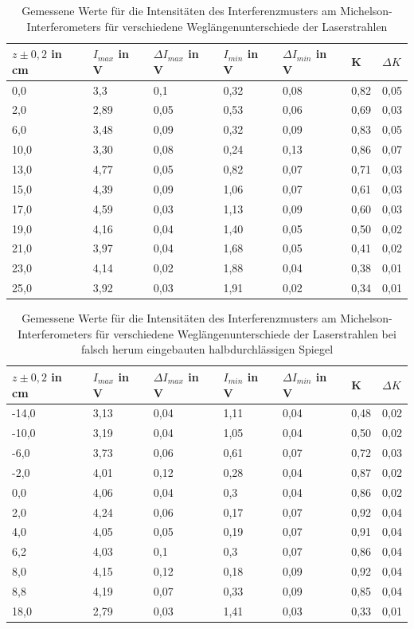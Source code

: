 \documentclass[10pt,a4paper]{article}
\begin{document}
\begin{table}[h!]
	\centering
	\begin{tabular}{|l|l|l|l|l|l|l|}\hline
		$z \pm 0,2$ in cm & $I_{max}$ in V & $\Delta I_{max}$ in V & $I_{min}$ in V & $\Delta I_{min}$ in V & K & $\Delta K$\\\hline
	0,0 & 3,3	& 0,1	& 0,32	& 0,08	& 0,82&		0,05\\
	2,0&	2,89&	0,05&	0,53&	0,06&	0,69 &	0,03\\
	6,0&	3,48&	0,09&	0,32&	0,09&	0,83&	0,05\\
	10,0&	3,30&	0,08&	0,24&	0,13&	0,86&		0,07\\
	13,0&	4,77&	0,05&	0,82&	0,07&	0,71&	0,03\\
	15,0&	4,39&	0,09&	1,06&	0,07&	0,61&	0,03\\
	17,0&	4,59&	0,03&	1,13&	0,09&	0,60&	0,03\\
	19,0&	4,16&	0,04&	1,40&	0,05&	0,50&	0,02\\
	21,0&	3,97&	0,04&	1,68&	0,05&	0,41&	0,02\\
	23,0&	4,14&	0,02&	1,88&	0,04&	0,38&	0,01\\
	25,0&	3,92&	0,03&	1,91&	0,02&	0,34&	0,01\\
		\hline
	\end{tabular}
	\caption{Gemessene Werte für die Intensitäten des Interferenzmusters am Michelson-Interferometers für verschiedene Weglängenunterschiede der Laserstrahlen}
	\label{ko1}
\end{table}

\begin{table}[h!]
	\centering
	\begin{tabular}{|l|l|l|l|l|l|l|}\hline
		$z \pm 0,2$ in cm & $I_{max}$ in V & $\Delta I_{max}$ in V & $I_{min}$ in V & $\Delta I_{min}$ in V & K & $\Delta K$\\\hline
		-14,0&	3,13&	0,04&	1,11&	0,04&	0,48&	0,02\\
		-10,0&	3,19&	0,04&	1,05&	0,04&	0,50&	0,02\\
		-6,0&	3,73&	0,06&	0,61&	0,07&	0,72&	0,03\\
		-2,0&	4,01&	0,12&	0,28&	0,04&	0,87&	0,02\\
		 0,0&	4,06&	0,04&	0,3&	0,04&	0,86&	0,02\\
		 2,0&	4,24&	0,06&	0,17&	0,07&	0,92&	0,04\\
		 4,0&	4,05&	0,05&	0,19&	0,07&	0,91&	0,04\\
		 6,2&	4,03&	0,1&	0,3&	0,07&	0,86&	0,04\\
		 8,0&	4,15&	0,12&	0,18&	0,09&	0,92&	0,04\\
		 8,8&	4,19&	0,07&	0,33&	0,09&	0,85&	0,04\\
		 18,0&	2,79&	0,03&	1,41&	0,03&	0,33&	0,01\\
		
		\hline
	\end{tabular}
	\caption{Gemessene Werte für die Intensitäten des Interferenzmusters am Michelson-Interferometers für verschiedene Weglängenunterschiede der Laserstrahlen bei falsch herum eingebauten halbdurchlässigen Spiegel }
	\label{ko2}
	\end{table}
	
\end{document}
